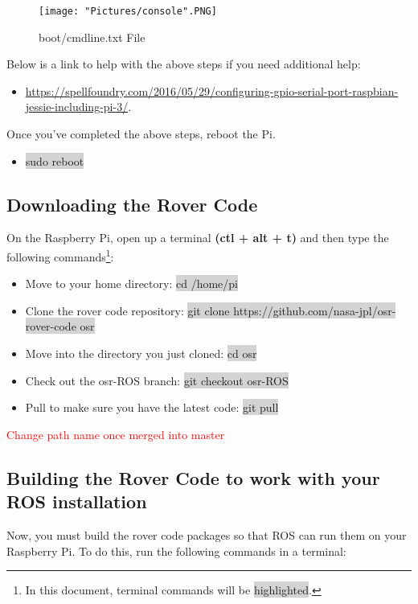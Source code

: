 \documentclass{article}
\begin{document}
\begin{figure}[H]
 	\centering
	\texttt{[image: "Pictures/console".PNG]}
 	\caption{boot/cmdline.txt File}
	\label{console}
\end{figure}

\noindent Below is a link to help with the above steps if you need additional help:
\begin{itemize}
	\item \href{https://spellfoundry.com/2016/05/29/configuring-gpio-serial-port-raspbian-jessie-including-pi-3/}{https://spellfoundry.com/2016/05/29/configuring-gpio-serial-port-raspbian-jessie-including-pi-3/}. 
\end{itemize}
\noindent Once you've completed the above steps, reboot the Pi.
\begin{itemize}
	\item[] \colorbox{lightgray}{sudo reboot}
\end{itemize}

\subsection{Downloading the Rover Code}
On the Raspberry Pi, open up a terminal \textbf{(ctl + alt + t)} and then type the following commands\footnote{In this document, terminal commands will be \colorbox{lightgray}{highlighted}.}:

\begin{itemize}
	\item[] Move to your home directory: \colorbox{lightgray}{cd /home/pi}
	\item[] Clone the rover code repository: \colorbox{lightgray}{git clone https://github.com/nasa-jpl/osr-rover-code osr}
	\item[] Move into the directory you just cloned: \colorbox{lightgray}{cd osr}
	\item[] Check out the osr-ROS branch: \colorbox{lightgray}{git checkout osr-ROS}
	\item[] Pull to make sure you have the latest code: \colorbox{lightgray}{git pull}
\end{itemize}

\textcolor{red}{Change path name once merged into master}

\subsection{Building the Rover Code to work with your ROS installation}
Now, you must build the rover code packages so that ROS can run them on your Raspberry Pi.  To do this, run the following commands in a terminal:
\end{document}
